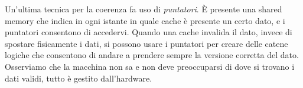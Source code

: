 Un'ultima tecnica per la coerenza fa uso di \textit{puntatori}. \MakeUppercase{è} presente una shared memory che indica in ogni istante in quale cache è presente un certo dato, e i puntatori consentono di accedervi. Quando una cache invalida il dato, invece di spostare fisicamente i dati, si possono usare i puntatori per creare delle catene logiche che consentono di andare a prendere sempre la versione corretta del dato. Osserviamo che la macchina non sa e non deve preoccuparsi di dove si trovano i dati validi, tutto è gestito dall'hardware.

